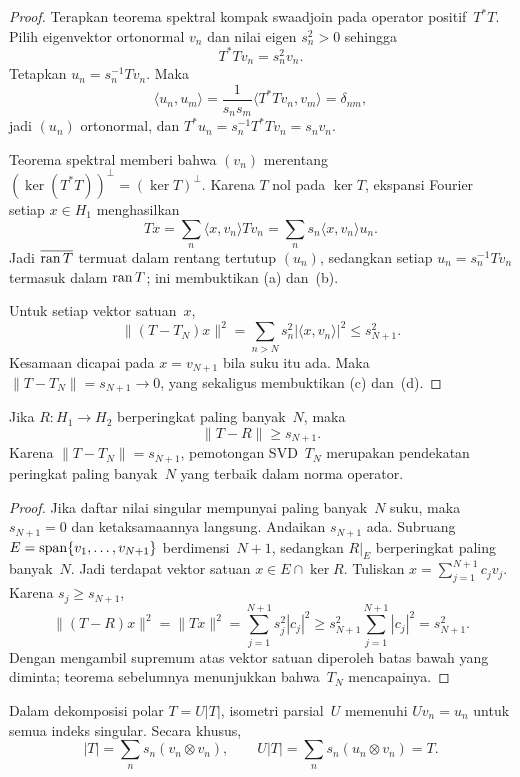 \begin{proof}
Terapkan teorema spektral kompak swaadjoin pada operator positif~$T^*T$.
Pilih eigenvektor ortonormal $v_n$ dan nilai eigen
$s_n^2>0$ sehingga
\[
 T^*Tv_n=s_n^2v_n.
\]
Tetapkan $u_n=s_n^{-1}Tv_n$. Maka
\[
 \langle u_n,u_m\rangle
 =\frac{1}{s_ns_m}\langle T^*Tv_n,v_m\rangle
 =\delta_{nm},
\]
jadi $(u_n)$ ortonormal, dan
$T^*u_n=s_n^{-1}T^*Tv_n=s_nv_n$.

Teorema spektral memberi bahwa $(v_n)$ merentang
$(\ker(T^*T))^\perp=(\ker T)^\perp$. Karena $T$ nol pada $\ker T$, ekspansi
Fourier setiap $x\in H_1$ menghasilkan
\[
 Tx=\sum_n\langle x,v_n\rangle Tv_n
   =\sum_n s_n\langle x,v_n\rangle u_n.
\]
Jadi $\overline{\operatorname{ran} T}$ termuat dalam rentang tertutup $(u_n)$, sedangkan setiap
$u_n=s_n^{-1}Tv_n$ termasuk dalam $\operatorname{ran} T$; ini membuktikan (a) dan~(b).

Untuk setiap vektor satuan~$x$,
\[
 \|(T-T_N)x\|^2
 =\sum_{n>N}s_n^2|\langle x,v_n\rangle|^2
 \leq s_{N+1}^2.
\]
Kesamaan dicapai pada $x=v_{N+1}$ bila suku itu ada. Maka
$\|T-T_N\|=s_{N+1}\to0$, yang sekaligus membuktikan (c) dan~(d).
\end{proof}

\begin{cor}
\label{o008bridge:best-rank-n}
Jika $R\colon H_1\to H_2$ berperingkat paling banyak~$N$, maka
\[
  \|T-R\|\geq s_{N+1}.
\]
Karena $\|T-T_N\|=s_{N+1}$, pemotongan SVD~$T_N$ merupakan pendekatan
peringkat paling banyak~$N$ yang terbaik dalam norma operator.
\end{cor}

\begin{proof}
Jika daftar nilai singular mempunyai paling banyak~$N$ suku, maka
$s_{N+1}=0$ dan ketaksamaannya langsung. Andaikan $s_{N+1}$ ada.
Subruang $E=\operatorname{span}\{v_1,\ldots,v_{N+1}\}$ berdimensi~$N+1$, sedangkan
$R|_E$ berperingkat paling banyak~$N$. Jadi terdapat vektor satuan
$x\in E\cap\ker R$. Tuliskan $x=\sum_{j=1}^{N+1}c_jv_j$. Karena
$s_j\geq s_{N+1}$,
\[
 \|(T-R)x\|^2=\|Tx\|^2
 =\sum_{j=1}^{N+1}s_j^2|c_j|^2
 \geq s_{N+1}^2\sum_{j=1}^{N+1}|c_j|^2
 =s_{N+1}^2.
\]
Dengan mengambil supremum atas vektor satuan diperoleh batas bawah yang
diminta; teorema sebelumnya menunjukkan bahwa~$T_N$ mencapainya.
\end{proof}

\begin{prop}
\label{o008bridge:svd-polar}
Dalam dekomposisi polar $T=U|T|$, isometri parsial~$U$ memenuhi
$Uv_n=u_n$ untuk semua indeks singular. Secara khusus,
\[
 |T|=\sum_n s_n(v_n\otimes v_n),
 \qquad
 U|T|=\sum_n s_n(u_n\otimes v_n)=T.
\]
\end{prop}

